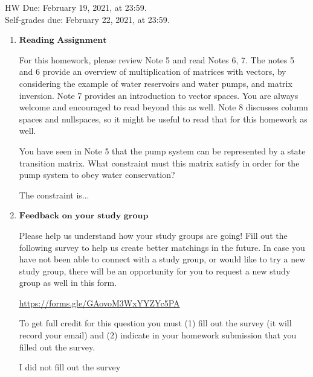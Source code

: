 \documentclass[11pt]{article}
\begin{document}
\maketitle
\fontsize{12}{15}\selectfont

\begin{center}
	HW Due: February 19, 2021, at 23:59. \\
	Self-grades due: February 22, 2021, at 23:59.
\end{center}

\begin{enumerate}
	\item $\textbf{Reading Assignment}$
	      	      	              
	      For this homework, please review Note 5 and read Notes 6, 7. The notes 5 and 6 provide an overview of multiplication of matrices with vectors, by considering the example of water reservoirs and water pumps, and matrix inversion. Note 7 provides an introduction to vector spaces. You are always welcome and encouraged to read beyond this as well. Note 8 discusses column spaces and nullspaces, so it might be useful to read that for this homework as well.
	      	      	              
	      You have seen in Note 5 that the pump system can be represented by a state transition matrix. What constraint must this matrix satisfy in order for the pump system to obey water conservation?
	      \begin{Answer}
	      	The constraint is...
	      \end{Answer}
	      	      	      
	      	      	      
	      \newpage
	\item $\textbf{Feedback on your study group}$
	      	      	         
	      Please help us understand how your study groups are going! Fill out the following survey to help us create better matchings in the future. In case you have not been able to connect with a study group, or would like to try a new study group, there will be an opportunity for you to request a new study group as well in this form.
	      	      	             
	      \href{https://forms.gle/GAovoM3WxYYZYc5PA}{https://forms.gle/GAovoM3WxYYZYc5PA}
	      	      	             
	      To get full credit for this question you must (1) fill out the survey (it will record your email) and (2) indicate in your homework submission that you filled out the survey.
	      \begin{Answer}
	      	I did not fill out the survey
	      \end{Answer}
	      	      	             

\end{enumerate}
\end{document}
